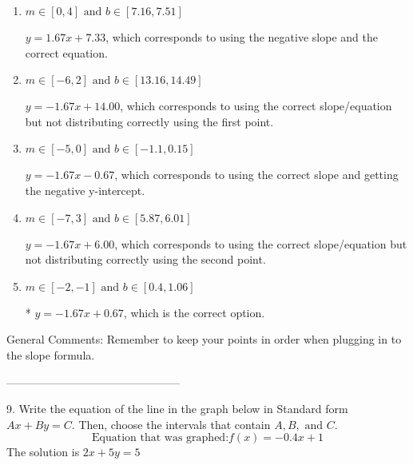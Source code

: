 \documentclass{extbook}[14pt]
\begin{document}
\begin{enumerate}[label=\Alph*.] 
\item $ m \in [0, 4] \text{ and } b \in [7.16, 7.51] $ 

  $y = 1.67x + 7.33$, which corresponds to using the negative slope and the correct equation. 
\item $ m \in [-6, 2] \text{ and } b \in [13.16, 14.49] $ 

  $y = -1.67x + 14.00$, which corresponds to using the correct slope/equation but not distributing correctly using the first point. 
\item $ m \in [-5, 0] \text{ and } b \in [-1.1, 0.15] $ 

  $y = -1.67x - 0.67$, which corresponds to using the correct slope and getting the negative y-intercept. 
\item $ m \in [-7, 3] \text{ and } b \in [5.87, 6.01] $ 

  $y = -1.67x + 6.00$, which corresponds to using the correct slope/equation but not distributing correctly using the second point. 
\item $ m \in [-2, -1] \text{ and } b \in [0.4, 1.06] $ 

 * $y = -1.67x + 0.67$, which is the correct option. 
\end{enumerate} 
 
General Comments: Remember to keep your points in order when plugging in to the slope formula.

-----------------------------------------------

9. Write the equation of the line in the graph below in Standard form $Ax+By=C$. Then, choose the intervals that contain $A, B, \text{ and } C$.
\[ \text{Equation that was graphed:} f(x)= -0.4 x + 1 \] 
The solution is $ 2 x + 5 y = 5 $ 
\end{document}
